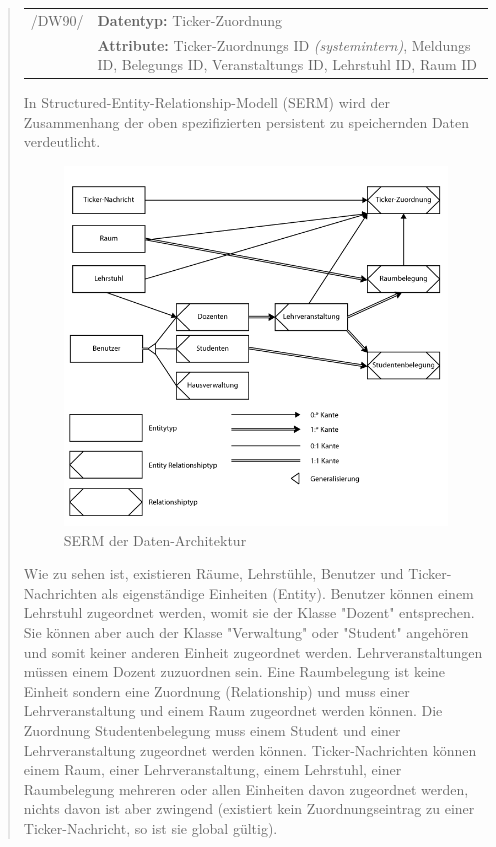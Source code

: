 \begin{quote}
\begin{tabular}{p{1.5cm}p{14.5cm}}
	 /DW90/& \textbf{Datentyp:} Ticker-Zuordnung \\
				& \textbf{Attribute:} Ticker-Zuordnungs ID \textsl{(systemintern)}, Meldungs ID, Belegungs ID, Veranstaltungs ID, Lehrstuhl ID, Raum ID \\[0.25cm]
		
\end{tabular}


In Structured-Entity-Relationship-Modell (SERM) wird der Zusammenhang der oben spezifizierten persistent zu speichernden Daten verdeutlicht. \\

\begin{figure}
\includegraphics[scale=0.70]{./images/section_5/dbserm}
\caption{SERM der Daten-Architektur}
\label{fig:dbserm}
\end{figure}

Wie zu sehen ist, existieren Räume, Lehrstühle, Benutzer und Ticker-Nachrichten als eigenständige Einheiten (Entity). Benutzer können einem Lehrstuhl zugeordnet werden, womit sie der Klasse "Dozent" entsprechen. Sie können aber auch der Klasse "Verwaltung" oder "Student" angehören und somit keiner anderen Einheit zugeordnet werden. Lehrveranstaltungen müssen einem Dozent zuzuordnen sein. Eine Raumbelegung ist keine Einheit sondern eine Zuordnung (Relationship) und muss einer Lehrveranstaltung und einem Raum zugeordnet werden können. Die Zuordnung Studentenbelegung muss einem Student und einer Lehrveranstaltung zugeordnet werden können. Ticker-Nachrichten können einem Raum, einer Lehrveranstaltung, einem Lehrstuhl, einer Raumbelegung mehreren oder allen Einheiten davon zugeordnet werden, nichts davon ist aber zwingend (existiert kein Zuordnungseintrag zu einer Ticker-Nachricht, so ist sie global gültig). \\


\end{quote}
